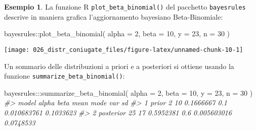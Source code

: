 \documentclass[
]{memoir}
\newenvironment{Shaded}{\begin{snugshade}}{\end{snugshade}}
\newcommand{\AttributeTok}[1]{\textcolor[rgb]{0.77,0.63,0.00}{#1}}
\newcommand{\CommentTok}[1]{\textcolor[rgb]{0.56,0.35,0.01}{\textit{#1}}}
\newcommand{\DecValTok}[1]{\textcolor[rgb]{0.00,0.00,0.81}{#1}}
\newcommand{\FunctionTok}[1]{\textcolor[rgb]{0.00,0.00,0.00}{#1}}
\newcommand{\NormalTok}[1]{#1}
\newcommand{\SpecialCharTok}[1]{\textcolor[rgb]{0.00,0.00,0.00}{#1}}
\theoremstyle{definition}
\theoremstyle{definition}
\newtheorem{example}{Esempio}[chapter]
\theoremstyle{definition}
\theoremstyle{definition}
\theoremstyle{remark}
\begin{document}
\begin{example}

La funzione R \texttt{plot\_beta\_binomial()} del pacchetto \texttt{bayesrules} descrive in maniera grafica l'aggiornamento bayesiano Beta-Binomiale:

\begin{Shaded}
\begin{Highlighting}[]
\NormalTok{bayesrules}\SpecialCharTok{::}\FunctionTok{plot\_beta\_binomial}\NormalTok{(}
  \AttributeTok{alpha =} \DecValTok{2}\NormalTok{, }\AttributeTok{beta =} \DecValTok{10}\NormalTok{, }\AttributeTok{y =} \DecValTok{23}\NormalTok{, }\AttributeTok{n =} \DecValTok{30}
\NormalTok{)}
\end{Highlighting}
\end{Shaded}

\begin{center}\texttt{[image: 026\_distr\_coniugate\_files/figure-latex/unnamed-chunk-10-1]} \end{center}

Un sommario delle distribuzioni a priori e a posteriori si ottiene usando la funzione \texttt{summarize\_beta\_binomial()}:

\begin{Shaded}
\begin{Highlighting}[]
\NormalTok{bayesrules}\SpecialCharTok{:::}\FunctionTok{summarize\_beta\_binomial}\NormalTok{(}
  \AttributeTok{alpha =} \DecValTok{2}\NormalTok{, }\AttributeTok{beta =} \DecValTok{10}\NormalTok{, }\AttributeTok{y =} \DecValTok{23}\NormalTok{, }\AttributeTok{n =} \DecValTok{30}
\NormalTok{)}
\CommentTok{\#\textgreater{}       model alpha beta      mean mode         var        sd}
\CommentTok{\#\textgreater{} 1     prior     2   10 0.1666667  0.1 0.010683761 0.1033623}
\CommentTok{\#\textgreater{} 2 posterior    25   17 0.5952381  0.6 0.005603016 0.0748533}
\end{Highlighting}
\end{Shaded}

\end{example}
\end{document}
